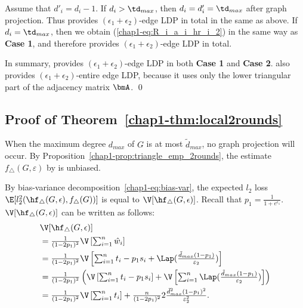 Assume that $d'_i = d_i - 1$. 
If $d_i > \td_{max}$, then $d_i = d'_i = \td_{max}$ after graph projection. 
Thus  provides $(\epsilon_1 + \epsilon_2)$-edge LDP in total in the same as above. 
If $d_i = \td_{max}$, then we obtain (\ref{chap1-eq:R_i_a_i_hr_i_2}) in the same way as \textbf{Case 1}, and therefore  provides $(\epsilon_1 + \epsilon_2)$-edge LDP in total.

\smallskip
In summary,  provides $(\epsilon_1 + \epsilon_2)$-edge LDP in both \textbf{Case 1} and \textbf{Case 2}. 
 also provides $(\epsilon_1 + \epsilon_2)$-entire edge LDP, because it uses only the lower triangular part of the adjacency matrix $\bmA$. \qed

\subsection{Proof of Theorem~\ref{chap1-thm:local2rounds}}
  When the maximum degree $d_{max}$ of $G$ is at most $\tilde{d}_{max}$, no graph
  projection will occur.
  By Proposition~\ref{chap1-prop:triangle_emp_2rounds}, the estimate
  $f_\triangle(G,\varepsilon)$ by  is unbiased.

  By bias-variance
  decomposition~\eqref{chap1-eq:bias-var}, the expected $l_2$ loss
  $\E[l_2^2(\hf_\triangle(G, \epsilon), f_\triangle(G))]$ is equal to
  $\V[\hf_\triangle(G,\epsilon)]$.
  Recall that $p_1 = \frac{1}{1+e^{\epsilon_1}}$.
  $\V[\hf_\triangle(G,\epsilon)]$ 
  can be written as follows:
  \begin{align}
    &\V[\hf_\triangle(G,\epsilon)] \\
    &= \textstyle{\frac{1}{(1-2p_1)^2}\V\left[\sum_{i=1}^n
    \hat{w}_i\right]} \nonumber \\
    &= \textstyle{\frac{1}{(1-2p_1)^2}\V\left[\sum_{i=1}^n
    t_i - p_1 s_i +
    \Lap(\frac{\tilde{d}_{max}(1-p_1)}{\varepsilon_2})\right]} \nonumber \\
    &= \textstyle{\frac{1}{(1-2p_1)^2}\left(\V\left[\sum_{i=1}^n
    t_i - p_1 s_i \right] +
    \V\left[\sum_{i=1}^n
    \Lap(\frac{\tilde{d}_{max}(1-p_1)}{\varepsilon_2})\right]\right)} \nonumber \\
    &= \textstyle{\frac{1}{(1-2p_1)^2}\V\left[\sum_{i=1}^n
    t_i \right] + \frac{n}{(1-2p_1)^2}
    2\frac{\tilde{d}_{max}^2(1-p_1)^2}{\varepsilon_2^2}}.\label{chap1-eq:local2rounds-var}
  \end{align}

